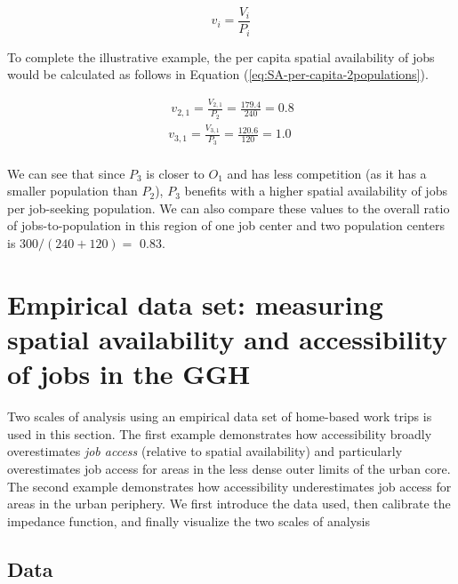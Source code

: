 \documentclass[]{elsarticle} %
\begin{document}
\begin{equation}
\label{eq:SA-per-capita}
v_i = \frac{V_i}{P_i}
\end{equation}

To complete the illustrative example, the per capita spatial
availability of jobs would be calculated as follows in Equation
(\ref{eq:SA-per-capita-2populations}).

\begin{equation}
\label{eq:SA-per-capita-2populations}
\begin{array}{l}\
v_{2,1} = \frac{V_{2,1}}{P_2} =  \frac{179.4}{240} = 0.8\\
v_{3,1} =  \frac{V_{3,1}}{P_3} =  \frac{120.6}{120} = 1.0\\
\end{array}
\end{equation}

We can see that since \(P_3\) is closer to \(O_1\) and has less
competition (as it has a smaller population than \(P_2\)), \(P_3\)
benefits with a higher spatial availability of jobs per job-seeking
population. We can also compare these values to the overall ratio of
jobs-to-population in this region of one job center and two population
centers is \(300/(240 + 120)=\) 0.83.

\hypertarget{empirical-data-set-measuring-spatial-availability-and-accessibility-of-jobs-in-the-ggh}{%
\section{Empirical data set: measuring spatial availability and
accessibility of jobs in the
GGH}\label{empirical-data-set-measuring-spatial-availability-and-accessibility-of-jobs-in-the-ggh}}

Two scales of analysis using an empirical data set of home-based work
trips is used in this section. The first example demonstrates how
accessibility broadly overestimates \emph{job access} (relative to
spatial availability) and particularly overestimates job access for
areas in the less dense outer limits of the urban core. The second
example demonstrates how accessibility underestimates job access for
areas in the urban periphery. We first introduce the data used, then
calibrate the impedance function, and finally visualize the two scales
of analysis

\hypertarget{data}{%
\subsection{Data}\label{data}}
\end{document}
